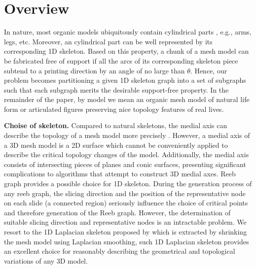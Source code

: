 \section{Overview}

In nature, most organic models ubiquitously contain cylindrical parts \cite{Zhou:2015:GCD}, e.g., arms, legs, etc. Moreover, an cylindrical part can be well represented by its corresponding 1{D} skeleton. Based on this property, a chunk of a mesh model can be fabricated free of support {if all the arcs of its corresponding skeleton piece subtend to a printing direction by an angle of no large than $\theta$.} Hence, our problem becomes partitioning a given 1{D} skeleton graph into a set of subgraphs such that each subgraph merits the desirable support-free property. In the remainder of the paper, by model we mean an organic mesh model of natural life form or articulated figures preserving nice topology features of real lives.

\textbf{Choise of skeleton.} Compared to natural skeletons, the medial axis can describe the topology of a mesh model more precisely \cite{ZhangXWYTW15}. However, a medial axis of a 3D mesh model is a 2D surface which cannot be conveniently applied to describe the critical topology changes of the model. Additionally, the medial axis consists of intersecting pieces of planes and conic surfaces, presenting significant complications to algorithms that attempt to construct 3D medial axes.
Reeb graph provides a possible choice for 1D skeleton. During the generation process of any reeb graph, the slicing direction and the position of the representative node on each slide (a connected region) seriously influence the choice of critical points and therefore generation of the Reeb graph. However, the determination of suitable slicing direction and representative nodes is an intractable problem. We resort to the 1D Laplacian skeleton proposed by \cite{AuTCCL08} which is extracted by shrinking the mesh model using Laplacian smoothing, such 1D Laplacian skeleton provides an excellent choice for reasonably describing the geometrical and topological variations of any 3{D} model.





